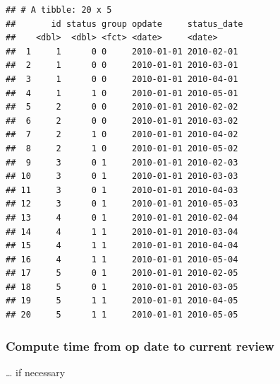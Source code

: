 \documentclass[
]{book}
\newenvironment{Shaded}{\begin{snugshade}}{\end{snugshade}}
\newcommand{\DataTypeTok}[1]{\textcolor[rgb]{0.13,0.29,0.53}{#1}}
\newcommand{\KeywordTok}[1]{\textcolor[rgb]{0.13,0.29,0.53}{\textbf{#1}}}
\newcommand{\NormalTok}[1]{#1}
\newcommand{\OperatorTok}[1]{\textcolor[rgb]{0.81,0.36,0.00}{\textbf{#1}}}
\newcommand{\StringTok}[1]{\textcolor[rgb]{0.31,0.60,0.02}{#1}}
\begin{document}
\begin{verbatim}
## # A tibble: 20 x 5
##       id status group opdate     status_date
##    <dbl>  <dbl> <fct> <date>     <date>     
##  1     1      0 0     2010-01-01 2010-02-01 
##  2     1      0 0     2010-01-01 2010-03-01 
##  3     1      0 0     2010-01-01 2010-04-01 
##  4     1      1 0     2010-01-01 2010-05-01 
##  5     2      0 0     2010-01-01 2010-02-02 
##  6     2      0 0     2010-01-01 2010-03-02 
##  7     2      1 0     2010-01-01 2010-04-02 
##  8     2      1 0     2010-01-01 2010-05-02 
##  9     3      0 1     2010-01-01 2010-02-03 
## 10     3      0 1     2010-01-01 2010-03-03 
## 11     3      0 1     2010-01-01 2010-04-03 
## 12     3      0 1     2010-01-01 2010-05-03 
## 13     4      0 1     2010-01-01 2010-02-04 
## 14     4      1 1     2010-01-01 2010-03-04 
## 15     4      1 1     2010-01-01 2010-04-04 
## 16     4      1 1     2010-01-01 2010-05-04 
## 17     5      0 1     2010-01-01 2010-02-05 
## 18     5      0 1     2010-01-01 2010-03-05 
## 19     5      1 1     2010-01-01 2010-04-05 
## 20     5      1 1     2010-01-01 2010-05-05
\end{verbatim}

\hypertarget{compute-time-from-op-date-to-current-review}{%
\subsubsection{Compute time from op date to current review}\label{compute-time-from-op-date-to-current-review}}

\ldots{} if necessary

\begin{Shaded}
\end{Shaded}
\end{document}

